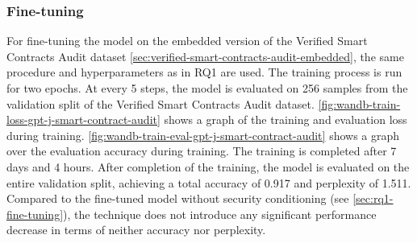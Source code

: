 \subsubsection{Fine-tuning}
For fine-tuning the model on the embedded version of the Verified Smart Contracts Audit dataset \cref{sec:verified-smart-contracts-audit-embedded}, the same procedure and hyperparameters as in RQ1 \label{sec:rq1-fine-tuning} are used. The training process is run for two epochs. At every 5 steps, the model is evaluated on 256 samples from the validation split of the Verified Smart Contracts Audit dataset. \cref{fig:wandb-train-loss-gpt-j-smart-contract-audit} shows a graph of the training and evaluation loss during training. \cref{fig:wandb-train-eval-gpt-j-smart-contract-audit} shows a graph over the evaluation accuracy during training. The training is completed after 7 days and 4 hours. After completion of the training, the model is evaluated on the entire validation split, achieving a total accuracy of 0.917 and perplexity of 1.511. Compared to the fine-tuned model without security conditioning (see \cref{sec:rq1-fine-tuning}), the technique does not introduce any significant performance decrease in terms of neither accuracy nor perplexity.


